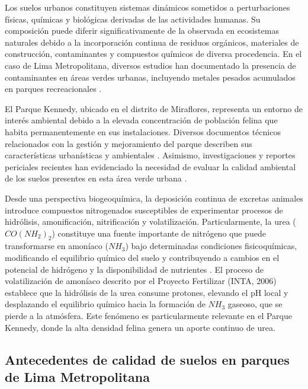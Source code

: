 \documentclass[fleqn]{jaes}
\begin{document}
Los suelos urbanos constituyen sistemas dinámicos sometidos a perturbaciones físicas, químicas y biológicas derivadas de las actividades humanas. Su composición puede diferir significativamente de la observada en ecosistemas naturales debido a la incorporación continua de residuos orgánicos, materiales de construcción, contaminantes y compuestos químicos de diversa procedencia. En el caso de Lima Metropolitana, diversos estudios han documentado la presencia de contaminantes en áreas verdes urbanas, incluyendo metales pesados acumulados en parques recreacionales \cite{Tello2018,TelloPerams2018}.

El Parque Kennedy, ubicado en el distrito de Miraflores, representa un entorno de interés ambiental debido a la elevada concentración de población felina que habita permanentemente en sus instalaciones. Diversos documentos técnicos relacionados con la gestión y mejoramiento del parque describen sus características urbanísticas y ambientales \cite{GerenciadeObrasPblicas2019,MunicipalidadDistritaldeMiraflores2019}. Asimismo, investigaciones y reportes periciales recientes han evidenciado la necesidad de evaluar la calidad ambiental de los suelos presentes en esta área verde urbana \cite{CentrodeMedicinaVeterinariaForense2023}.

Desde una perspectiva biogeoquímica, la deposición continua de excretas animales introduce compuestos nitrogenados susceptibles de experimentar procesos de hidrólisis, amonificación, nitrificación y volatilización. Particularmente, la urea ($CO(NH_2)_2$) constituye una fuente importante de nitrógeno que puede transformarse en amoníaco ($NH_3$) bajo determinadas condiciones fisicoquímicas, modificando el equilibrio químico del suelo y contribuyendo a cambios en el potencial de hidrógeno y la disponibilidad de nutrientes \cite{FertilizarEquipo}. El proceso de volatilización de amoníaco descrito por el Proyecto Fertilizar (INTA, 2006) establece que la hidrólisis de la urea consume protones, elevando el pH local y desplazando el equilibrio químico hacia la formación de $NH_3$ gaseoso, que se pierde a la atmósfera. Este fenómeno es particularmente relevante en el Parque Kennedy, donde la alta densidad felina genera un aporte continuo de urea.

\subsection{Antecedentes de calidad de suelos en parques de Lima Metropolitana}
\end{document}
